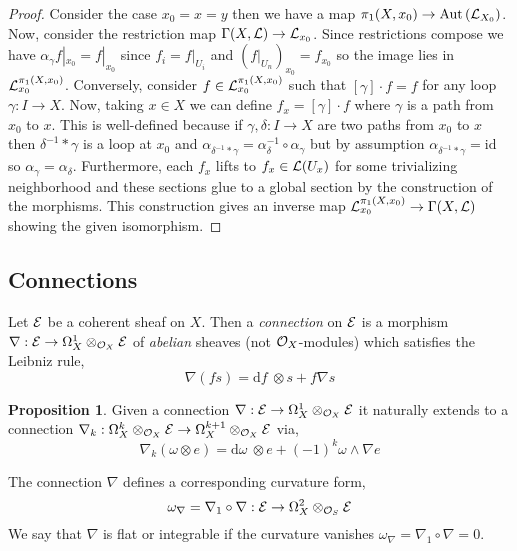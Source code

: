 \documentclass[12pt]{extarticle}
\newcommand{\id}{\mathrm{id}}
\renewcommand{\d}[1]{ \mathrm{d}#1 \:}
\theoremstyle{definition}
\newtheorem{proposition}[theorem]{Proposition}
\newenvironment{definition}[1][Definition:]{\begin{trivlist}
\item[\hskip \labelsep {\bfseries #1}]}{\end{trivlist}}
\newcommand{\Aut}[1]{\mathrm{Aut}\left(#1 \right)}
\begin{document}
\begin{proof}
Consider the case $x_0 = x = y$ then we have a map $\pi_1(X, x_0) \to \Aut{\L_{X_0}}$.  
Now, consider the restriction map $\Gamma(X, \mathcal{L}) \to \mathcal{L}_{x_0}$. Since restrictions compose we have $\alpha_\gamma f|_{x_0} = f|_{x_0}$ since $f_i = f|_{U_i}$ and $(f|_{U_n})_{x_0} = f_{x_0}$ so the image lies in $\mathcal{L}_{x_0}^{\pi_1(X, x_0)}$. Conversely, consider $f \in \mathcal{L}_{x_0}^{\pi_1(X, x_0)}$ such that $[ \gamma ] \cdot f = f$ for any loop $\gamma : I \to X$. Now, taking $x \in X$ we can define $f_x = [\gamma] \cdot f$ where $\gamma$ is a path from $x_0$ to $x$. This is well-defined because if $\gamma, \delta : I \to X$ are two paths from $x_0$ to $x$ then $\delta^{-1} * \gamma$ is a loop at $x_0$ and $\alpha_{\delta^{-1} * \gamma} = \alpha_\delta^{-1} \circ \alpha_\gamma$ but by assumption $\alpha_{\delta^{-1} * \gamma} = \id$ so $\alpha_\gamma = \alpha_\delta$. Furthermore, each $f_x$ lifts to $f_x \in \mathcal{L}(U_x)$ for some trivializing neighborhood and these sections glue to a global section by the construction of the morphisms. This construction gives an inverse map $\mathcal{L}_{x_0}^{\pi_1(X, x_0)} \to \Gamma(X, \mathcal{L})$ showing the given isomorphism.
\end{proof}

\subsection{Connections}


\begin{definition}
Let $\mathcal{E}$ be a coherent sheaf on $X$. Then a \textit{connection} on $\mathcal{E}$ is a morphism $\nabla : \mathcal{E} \to \Omega^1_X \otimes_{\mathcal{O}_{X}} \mathcal{E}$ of \textit{abelian} sheaves (not $\mathcal{O}_{X}$-modules) which satisfies the Leibniz rule,
\[ \nabla (f s) = \d{f} \otimes s + f \nabla  s \]
\end{definition}

\begin{proposition}
Given a connection $\nabla : \mathcal{E} \to \Omega^1_X \otimes_{\mathcal{O}_{X}} \mathcal{E}$ it naturally extends to a connection $\nabla_k : \Omega^k_X \otimes_{\mathcal{O}_{X}} \mathcal{E} \to \Omega^{k+1}_X \otimes_{\mathcal{O}_{X}} \mathcal{E}$ via,
\[ \nabla_k (\omega \otimes e) = \d{\omega} \otimes e + (-1)^k \omega \wedge \nabla e \]   
\end{proposition}


\begin{definition}
The connection $\nabla$ defines a corresponding curvature form,
\[ \omega_\nabla = \nabla_1 \circ \nabla : \mathcal{E} \to \Omega^2_X \otimes_{\mathcal{O}_{S}} \mathcal{E} \]
We say that $\nabla$ is flat or integrable if the curvature vanishes $\omega_\nabla = \nabla_1 \circ \nabla = 0$.
\end{definition}
\end{document}
